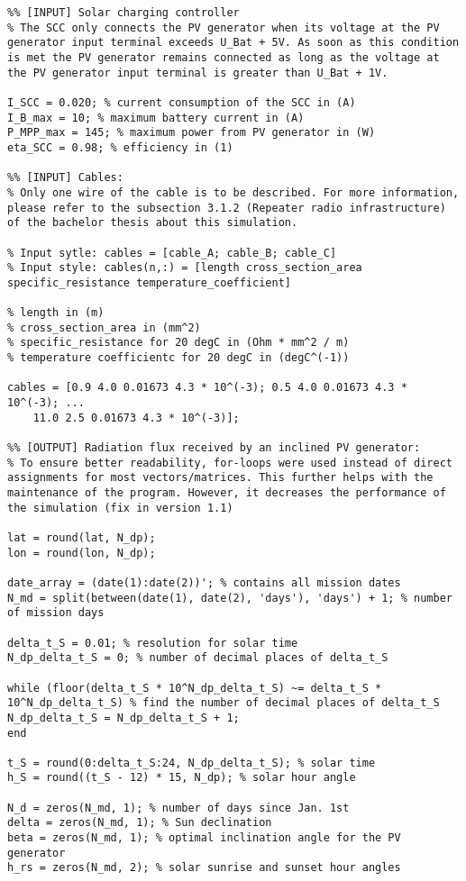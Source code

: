 \begin{lstlisting}
%% [INPUT] Solar charging controller
% The SCC only connects the PV generator when its voltage at the PV generator input terminal exceeds U_Bat + 5V. As soon as this condition is met the PV generator remains connected as long as the voltage at the PV generator input terminal is greater than U_Bat + 1V.

I_SCC = 0.020; % current consumption of the SCC in (A)
I_B_max = 10; % maximum battery current in (A)
P_MPP_max = 145; % maximum power from PV generator in (W)
eta_SCC = 0.98; % efficiency in (1)

%% [INPUT] Cables:
% Only one wire of the cable is to be described. For more information, please refer to the subsection 3.1.2 (Repeater radio infrastructure) of the bachelor thesis about this simulation.

% Input sytle: cables = [cable_A; cable_B; cable_C]
% Input style: cables(n,:) = [length cross_section_area specific_resistance temperature_coefficient]

% length in (m)
% cross_section_area in (mm^2)
% specific_resistance for 20 degC in (Ohm * mm^2 / m)
% temperature coefficientc for 20 degC in (degC^(-1))

cables = [0.9 4.0 0.01673 4.3 * 10^(-3); 0.5 4.0 0.01673 4.3 * 10^(-3); ...
    11.0 2.5 0.01673 4.3 * 10^(-3)];  

%% [OUTPUT] Radiation flux received by an inclined PV generator:
% To ensure better readability, for-loops were used instead of direct assignments for most vectors/matrices. This further helps with the maintenance of the program. However, it decreases the performance of the simulation (fix in version 1.1)

lat = round(lat, N_dp);
lon = round(lon, N_dp);

date_array = (date(1):date(2))'; % contains all mission dates
N_md = split(between(date(1), date(2), 'days'), 'days') + 1; % number of mission days

delta_t_S = 0.01; % resolution for solar time
N_dp_delta_t_S = 0; % number of decimal places of delta_t_S

while (floor(delta_t_S * 10^N_dp_delta_t_S) ~= delta_t_S * 10^N_dp_delta_t_S) % find the number of decimal places of delta_t_S
N_dp_delta_t_S = N_dp_delta_t_S + 1;
end

t_S = round(0:delta_t_S:24, N_dp_delta_t_S); % solar time
h_S = round((t_S - 12) * 15, N_dp); % solar hour angle

N_d = zeros(N_md, 1); % number of days since Jan. 1st
delta = zeros(N_md, 1); % Sun declination
beta = zeros(N_md, 1); % optimal inclination angle for the PV generator
h_rs = zeros(N_md, 2); % solar sunrise and sunset hour angles


\end{lstlisting}
